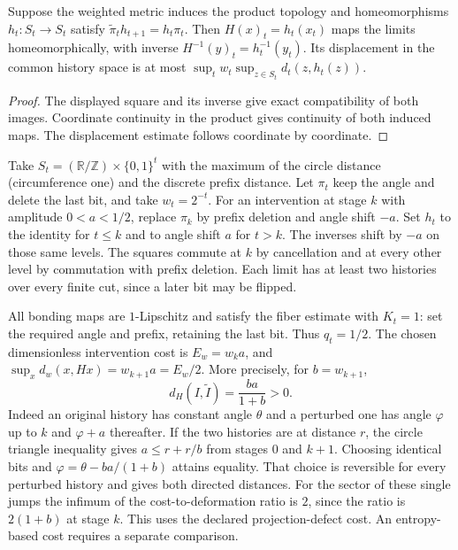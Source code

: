 \begin{proposition}\label{prop:coherent-history-transport}
Suppose the weighted metric induces the product topology and homeomorphisms $h_t:S_t\to S_t$ satisfy $\widetilde\pi_t h_{t+1}=h_t\pi_t$. Then $H(x)_t=h_t(x_t)$ maps the limits homeomorphically, with inverse $H^{-1}(y)_t=h_t^{-1}(y_t)$. Its displacement in the common history space is at most $\sup_t w_t\sup_{z\in S_t}d_t(z,h_t(z))$.
\end{proposition}
\begin{proof}
The displayed square and its inverse give exact compatibility of both images. Coordinate continuity in the product gives continuity of both induced maps. The displacement estimate follows coordinate by coordinate.
\end{proof}

\begin{example}\label{ex:coherent-rotation-tower}
Take $S_t=(\mathbb R/\mathbb Z)\times\{0,1\}^{t}$ with the maximum of the circle distance (circumference one) and the discrete prefix distance. Let $\pi_t$ keep the angle and delete the last bit, and take $w_t=2^{-t}$. For an intervention at stage $k$ with amplitude $0<a<1/2$, replace $\pi_k$ by prefix deletion and angle shift $-a$. Set $h_t$ to the identity for $t\leq k$ and to angle shift $a$ for $t>k$. The inverses shift by $-a$ on those same levels. The squares commute at $k$ by cancellation and at every other level by commutation with prefix deletion. Each limit has at least two histories over every finite cut, since a later bit may be flipped.

All bonding maps are $1$-Lipschitz and satisfy the fiber estimate with $K_t=1$: set the required angle and prefix, retaining the last bit. Thus $q_t=1/2$. The chosen dimensionless intervention cost is $E_w=w_k a$, and $\sup_x d_w(x,Hx)=w_{k+1}a=E_w/2$. More precisely, for $b=w_{k+1}$,
\[
 d_H(I,\widetilde I)=\frac{ba}{1+b}>0.
\]
Indeed an original history has constant angle $\theta$ and a perturbed one has angle $\varphi$ up to $k$ and $\varphi+a$ thereafter. If the two histories are at distance $r$, the circle triangle inequality gives $a\leq r+r/b$ from stages $0$ and $k+1$. Choosing identical bits and $\varphi=\theta-ba/(1+b)$ attains equality. That choice is reversible for every perturbed history and gives both directed distances. For the sector of these single jumps the infimum of the cost-to-deformation ratio is $2$, since the ratio is $2(1+b)$ at stage $k$. This uses the declared projection-defect cost. An entropy-based cost requires a separate comparison.
\end{example}

